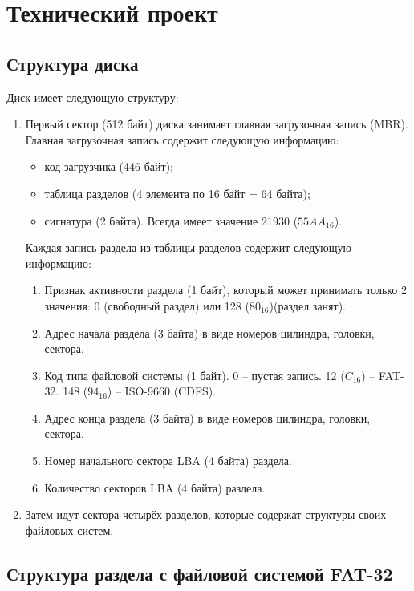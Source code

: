\section{Технический проект}

\subsection{Структура диска}

Диск имеет следующую структуру:

\begin{enumerate}
\item Первый сектор (512 байт) диска занимает главная загрузочная запись (MBR). Главная загрузочная запись содержит следующую информацию:

	\begin{itemize}
	\item код загрузчика (446 байт);
	\item таблица разделов (4 элемента по 16 байт = 64 байта);
	\item сигнатура (2 байта). Всегда имеет значение 21930 ($55AA_{16}$).
	\end{itemize}
	
Каждая запись раздела из таблицы разделов содержит следующую информацию:

	\begin{enumerate}
	\item Признак активности раздела (1 байт), который может принимать только 2 значения: 0 (свободный раздел) или 128 ($80_{16}$)(раздел занят).
	\item Адрес начала раздела (3 байта) в виде номеров цилиндра, головки, сектора.
	\item Код типа файловой системы (1 байт). 0 -- пустая запись. 12 ($C_{16}$) -- FAT-32. 148 ($94_{16}$) -- ISO-9660 (CDFS).
	\item Адрес конца раздела (3 байта) в виде номеров цилиндра, головки, сектора.
	\item Номер начального сектора LBA (4 байта) раздела.
	\item Количество секторов LBA (4 байта) раздела.
	\end{enumerate}
	
\item Затем идут сектора четырёх разделов, которые содержат структуры своих файловых систем.
\end{enumerate}

\subsection{Структура раздела с файловой системой FAT-32}

